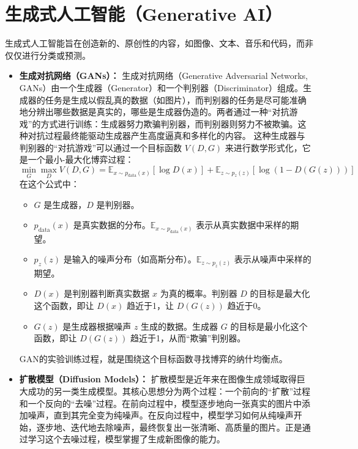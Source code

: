 \section{生成式人工智能（Generative AI）}
\label{sec:generative_ai}
生成式人工智能旨在创造新的、原创性的内容，如图像、文本、音乐和代码，而非仅仅进行分类或预测。
\begin{itemize}
    \item \textbf{生成对抗网络（GANs）：} 生成对抗网络（Generative Adversarial Networks, GANs）由一个生成器（Generator）和一个判别器（Discriminator）组成。生成器的任务是生成以假乱真的数据（如图片），而判别器的任务是尽可能准确地分辨出哪些数据是真实的，哪些是生成器伪造的。两者通过一种“对抗游戏”的方式进行训练：生成器努力欺骗判别器，而判别器则努力不被欺骗。这种对抗过程最终能驱动生成器产生高度逼真和多样化的内容。
    这种生成器与判别器的“对抗游戏”可以通过一个目标函数 $V(D, G)$ 来进行数学形式化，它是一个最小-最大化博弈过程：
	\[
		\min_G \max_D V(D, G) = \mathbb{E}_{x \sim p_{\text{data}}(x)}[\log D(x)] + \mathbb{E}_{z \sim p_{z}(z)}[\log(1 - D(G(z)))]
	\]
	在这个公式中：
	\begin{itemize}
		\item $G$ 是生成器，$D$ 是判别器。
		\item $p_{\text{data}}(x)$ 是真实数据的分布。$\mathbb{E}_{x \sim p_{\text{data}}(x)}$ 表示从真实数据中采样的期望。
		\item $p_{z}(z)$ 是输入的噪声分布（如高斯分布）。$\mathbb{E}_{z \sim p_{z}(z)}$ 表示从噪声中采样的期望。
		\item $D(x)$ 是判别器判断真实数据 $x$ 为真的概率。判别器 $D$ 的目标是最大化这个函数，即让 $D(x)$ 趋近于1，让 $D(G(z))$ 趋近于0。
		\item $G(z)$ 是生成器根据噪声 $z$ 生成的数据。生成器 $G$ 的目标是最小化这个函数，即让 $D(G(z))$ 趋近于1，从而“欺骗”判别器。
	\end{itemize}
	GAN的实验训练过程，就是围绕这个目标函数寻找博弈的纳什均衡点。
    \item \textbf{扩散模型（Diffusion Models）：} 扩散模型是近年来在图像生成领域取得巨大成功的另一类生成模型。其核心思想分为两个过程：一个前向的“扩散”过程和一个反向的“去噪”过程。在前向过程中，模型逐步地向一张真实的图片中添加噪声，直到其完全变为纯噪声。在反向过程中，模型学习如何从纯噪声开始，逐步地、迭代地去除噪声，最终恢复出一张清晰、高质量的图片。正是通过学习这个去噪过程，模型掌握了生成新图像的能力。
\end{itemize}

